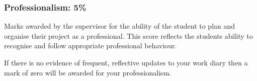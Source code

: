 \documentclass[11pt]{article}
\newcommand{\supervisorweight}{5\% }
\begin{document}
\begin{tabular}{||l|c|p{10cm}|c||}
%
%
%
\end{tabular}



\newpage
\subsubsection{Professionalism: \supervisorweight}
\label{sec:assess-supervisor}
Marks awarded by the supervisor for the ability of the student to plan and
organise their project as a professional.  This score reflects the students ability to recognise and follow appropriate professional behaviour.

If there is no evidence of frequent, reflective updates to your work diary then a mark of zero will be awarded for your professionalism.
\end{document}
